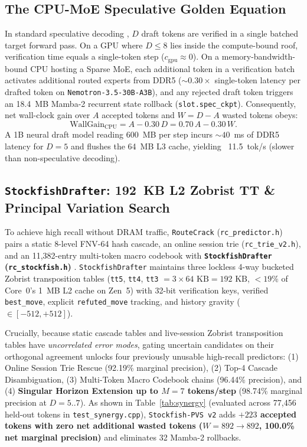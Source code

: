 \documentclass[10pt,twocolumn]{article}
\begin{document}
\subsection{The CPU-MoE Speculative Golden Equation}
In standard speculative decoding \cite{leviathan2023fast}, $D$ draft tokens are verified in a single batched target forward pass. On a GPU where $D \le 8$ lies inside the compute-bound roof, verification time equals a single-token step ($c_{\text{gpu}} \approx 0$). On a memory-bandwidth-bound CPU hosting a Sparse MoE, each additional token in a verification batch activates additional routed experts from DDR5 ($\sim 0.30\times$ single-token latency per drafted token on \texttt{Nemotron-3.5-30B-A3B}), and any rejected draft token triggers an 18.4~MB Mamba-2 recurrent state rollback (\texttt{slot.spec\_ckpt}). Consequently, net wall-clock gain over $A$ accepted tokens and $W = D - A$ wasted tokens obeys:
\begin{equation}
    \text{WallGain}_{\text{CPU}} = A - 0.30\, D = 0.70\, A - 0.30\, W.
\end{equation}
A 1B neural draft model reading 600~MB per step incurs $\sim 40$~ms of DDR5 latency for $D=5$ and flushes the 64~MB L3 cache, yielding ~11.5~tok/s (slower than non-speculative decoding).

\subsection{\texttt{StockfishDrafter}: 192~KB L2 Zobrist TT \& Principal Variation Search}
To achieve high recall without DRAM traffic, \texttt{RouteCrack} (\texttt{rc\_predictor.h}) pairs a static 8-level FNV-64 hash cascade, an online session trie (\texttt{rc\_trie\_v2.h}), and an 11,382-entry multi-token macro codebook with \textbf{\texttt{StockfishDrafter} (\texttt{rc\_stockfish.h})} \cite{stockfish}. \texttt{StockfishDrafter} maintains three lockless 4-way bucketed Zobrist transposition tables (\texttt{tt5}, \texttt{tt4}, \texttt{tt3} $= 3 \times 64\text{ KB} = 192\text{ KB}$, $<19\%$ of Core~0's 1~MB L2 cache on Zen~5) with 32-bit verification keys, verified \texttt{best\_move}, explicit \texttt{refuted\_move} tracking, and history gravity ($\in [-512, +512]$).

Crucially, because static cascade tables and live-session Zobrist transposition tables have \textit{uncorrelated error modes}, gating uncertain candidates on their orthogonal agreement unlocks four previously unusable high-recall predictors: (1) Online Session Trie Rescue (92.19\% marginal precision), (2) Top-4 Cascade Disambiguation, (3) Multi-Token Macro Codebook chains (96.44\% precision), and (4) \textbf{Singular Horizon Extension up to $M=7$ tokens/step} (98.74\% marginal precision at $D=5..7$). As shown in Table~\ref{tab:synergy} (evaluated across 77,456 held-out tokens in \texttt{test\_synergy.cpp}), \texttt{Stockfish-PVS v2} adds \textbf{$+223$ accepted tokens with zero net additional wasted tokens ($W=892 \to 892$, 100.0\% net marginal precision)} and eliminates 32 Mamba-2 rollbacks.
\end{document}
